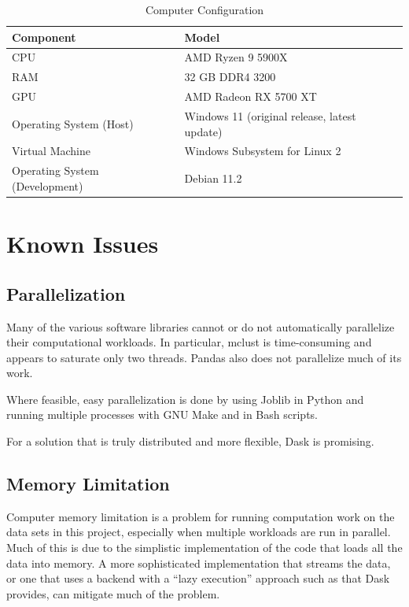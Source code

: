 \begin{theappendices}
\begin{table}[htbp]
\centering
\begin{tabular}{ll}
\toprule
                     Component &                                        Model \\
\midrule
                           CPU &                            AMD Ryzen 9 5900X \\
                           RAM &                              32 GB DDR4 3200 \\
                           GPU &                        AMD Radeon RX 5700 XT \\
       Operating System (Host) & Windows 11 (original release, latest update) \\
               Virtual Machine &                Windows Subsystem for Linux 2 \\
Operating System (Development) &                                  Debian 11.2 \\
\bottomrule
\end{tabular}
\caption{Computer Configuration}
\label{appendix:table:Computer Configuration}
\end{table}

\section{Known Issues}

\FloatBarrier
\subsection{Parallelization}

Many of the various software libraries cannot or do not automatically parallelize their computational workloads. In particular, mclust is time-consuming and appears to saturate only two threads. Pandas also does not parallelize much of its work.

Where feasible, easy parallelization is done by using Joblib in Python and running multiple processes with GNU Make and in Bash scripts.

For a solution that is truly distributed and more flexible, Dask is promising.

\FloatBarrier
\subsection{Memory Limitation}

Computer memory limitation is a problem for running computation work on the data sets in this project, especially when multiple workloads are run in parallel. Much of this is due to the simplistic implementation of the code that loads all the data into memory. A more sophisticated implementation that streams the data, or one that uses a backend with a ``lazy execution'' approach such as that Dask provides, can mitigate much of the problem.


\end{theappendices}